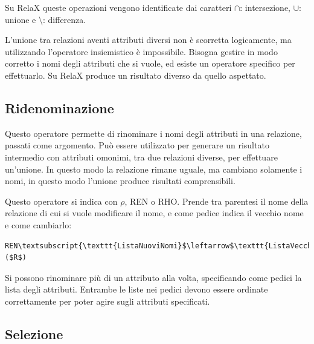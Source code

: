 \documentclass{article}
\numberwithin{equation}{subsection}
\begin{document}
Su RelaX queste operazioni vengono identificate dai caratteri $\cap$: intersezione, $\cup$: unione e $\setminus$: differenza. 

L'unione tra relazioni aventi attributi diversi non è scorretta logicamente, ma utilizzando l'operatore insiemistico è impossibile. Bisogna gestire in modo corretto i nomi degli 
attributi che si vuole, ed esiste un operatore specifico per effettuarlo. Su RelaX produce un risultato diverso da quello aspettato. 

\subsection{Ridenominazione}

Questo operatore permette di rinominare i nomi degli attributi in una relazione, passati come argomento. Può essere utilizzato per generare un risultato intermedio con attributi omonimi, tra due relazioni diverse, 
per effettuare un'unione. In questo modo la relazione rimane uguale, ma cambiano solamente i nomi, in questo modo l'unione produce risultati comprensibili. 

Questo operatore si indica con $\rho$, REN o RHO. Prende tra parentesi il nome della relazione di cui si vuole modificare il nome, e come pedice indica il vecchio nome e come cambiarlo:
\begin{Verbatim}[commandchars=\\\{\}, codes={\catcode`$=3\catcode`_=8}]
    REN\textsubscript{\texttt{ListaNuoviNomi}$\leftarrow$\texttt{ListaVecchiNomi}}($R$)
\end{Verbatim}

Si possono rinominare più di un attributo alla volta, specificando come pedici la lista degli attributi. Entrambe le liste nei pedici devono essere ordinate correttamente per poter agire sugli attributi specificati. 

\subsection{Selezione}
\end{document}
